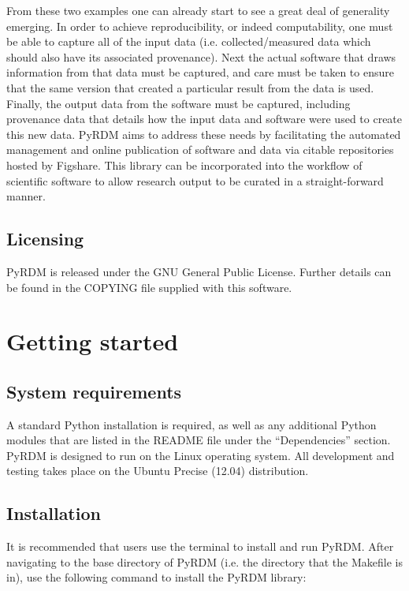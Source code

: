 \documentclass[a4paper,11pt]{report}
\begin{document}
From these two examples one can already start to see a great deal of generality emerging. In order to achieve reproducibility, or indeed computability, one must be able to capture all of the input data (i.e. collected/measured data which should also have its associated provenance). Next the actual software that draws information from that data must be captured, and care must be taken to ensure that the same version that created a particular result from the data is used. Finally, the output data from the software must be captured, including provenance data that details how the input data and software were used to create this new data. PyRDM aims to address these needs by facilitating the automated management and online publication of software and data via citable repositories hosted by Figshare. This library can be incorporated into the workflow of scientific software to allow research output to be curated in a straight-forward manner.


\section{Licensing}
PyRDM is released under the GNU General Public License. Further details can be found in the COPYING file supplied with this software.

\chapter{Getting started}\label{chap:getting_started}
\section{System requirements}
A standard Python installation is required, as well as any additional Python modules that are listed in the README file under the ``Dependencies'' section. PyRDM is designed to run on the Linux operating system. All development and testing takes place on the Ubuntu Precise (12.04) distribution.

\section{Installation}
It is recommended that users use the terminal to install and run PyRDM. After navigating to the base directory of PyRDM (i.e. the directory that the Makefile is in), use the following command to install the PyRDM library:
\end{document}
